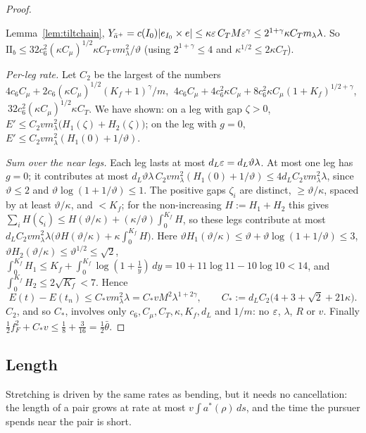 \begin{proof}
\begin{itemize}
Lemma~\ref{lem:tiltchain}, $Y_{\bar a^+}=c(I_0)|e_{I_0}\times e|\le\kappa\varepsilon\,C_TM\varepsilon^\gamma\le2^{1+\gamma}\kappa C_Tm_\lambda\lambda$.
So $\mathrm{II}_b\le32c_6^2(\kappa C_\mu)^{1/2}\kappa C_T\,vm_\lambda^2/\vartheta$ (using $2^{1+\gamma}\le4$ and
$\kappa^{1/2}\le2\kappa C_T$).
\end{itemize}
\emph{Per-leg rate.} Let $C_2$ be the largest of the numbers
$4c_6C_\mu+2c_6(\kappa C_\mu)^{1/2}(K_f+1)^\gamma/m$, $\ 4c_6C_\mu+4c_6^2\kappa C_\mu+8c_6^2\kappa C_\mu(1+K_f)^{1/2+\gamma}$,
$\ 32c_6^2(\kappa C_\mu)^{1/2}\kappa C_T$. We have shown: on a leg with gap $\zeta>0$,
$E'\le C_2vm_\lambda^2\bigl(H_1(\zeta)+H_2(\zeta)\bigr)$; on the leg with $g=0$, $E'\le C_2vm_\lambda^2(H_1(0)+1/\vartheta)$.

\emph{Sum over the near legs.} Each leg lasts at most $d_L\varepsilon=d_L\vartheta\lambda$. At most one leg has $g=0$; it
contributes at most $d_L\vartheta\lambda\,C_2vm_\lambda^2(H_1(0)+1/\vartheta)\le4d_LC_2vm_\lambda^2\lambda$, since
$\vartheta\le2$ and $\vartheta\log(1+1/\vartheta)\le1$. The positive gaps $\zeta_i$ are distinct, $\ge\vartheta/\kappa$, spaced by at
least $\vartheta/\kappa$, and $<K_f$; for the non-increasing $H:=H_1+H_2$ this gives
$\sum_iH(\zeta_i)\le H(\vartheta/\kappa)+(\kappa/\vartheta)\int_0^{K_f}H$, so these legs contribute at most
$d_LC_2vm_\lambda^2\lambda\bigl(\vartheta H(\vartheta/\kappa)+\kappa\int_0^{K_f}H\bigr)$. Here
$\vartheta H_1(\vartheta/\kappa)\le\vartheta+\vartheta\log(1+1/\vartheta)\le3$, $\vartheta H_2(\vartheta/\kappa)\le\vartheta^{1/2}\le\sqrt2$,
$\int_0^{K_f}H_1\le K_f+\int_0^{K_f}\log(1+\frac1y)\,dy=10+11\log11-10\log10<14$, and
$\int_0^{K_f}H_2\le2\sqrt{K_f}<7$. Hence
\begin{equation}\label{eq:Cstar}
E(t)-E(t_n)\le C_*vm_\lambda^2\lambda=C_*vM^2\lambda^{1+2\gamma},\qquad C_*:=d_LC_2\bigl(4+3+\sqrt2+21\kappa\bigr).
\end{equation}
$C_2$, and so $C_*$, involves only $c_6,C_\mu,C_T,\kappa,K_f,d_L$ and $1/m$: no $\varepsilon$, $\lambda$, $R$ or $v$.
Finally $\frac12f_F^2+C_*v\le\frac18+\frac3{16}=\frac12\bar\theta$.
\end{proof}

\subsection{Length}\label{app:walk:length}

Stretching is driven by the same rates as bending, but it needs no cancellation: the length of a pair grows at rate at
most $v\int a^*(\rho)\,ds$, and the time the pursuer spends near the pair is short.

